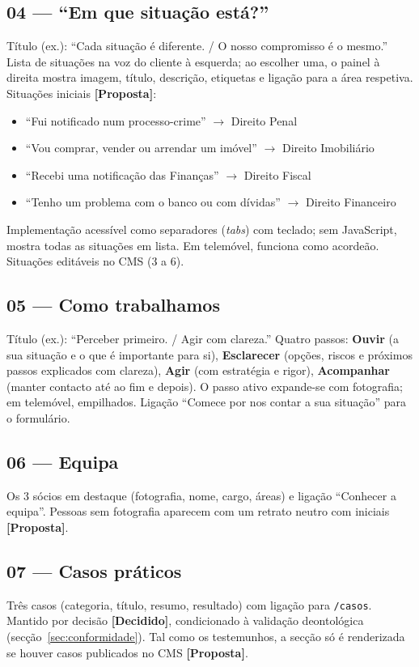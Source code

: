 \documentclass[11pt,a4paper]{article}
\newcommand{\decidido}{\textcolor{verde700}{\textbf{[Decidido]}}}
\newcommand{\proposta}{\textcolor{bronze}{\textbf{[Proposta]}}}
\begin{document}
\subsection*{04 --- ``Em que situação está?''}\label{sec:situacoes}
Título (ex.): ``Cada situação é diferente. / O nosso compromisso é o mesmo.'' Lista de situações na voz do cliente à esquerda; ao escolher uma, o painel à direita mostra imagem, título, descrição, etiquetas e ligação para a área respetiva. Situações iniciais \proposta:
\begin{itemize}
  \item ``Fui notificado num processo-crime'' $\rightarrow$ Direito Penal
  \item ``Vou comprar, vender ou arrendar um imóvel'' $\rightarrow$ Direito Imobiliário
  \item ``Recebi uma notificação das Finanças'' $\rightarrow$ Direito Fiscal
  \item ``Tenho um problema com o banco ou com dívidas'' $\rightarrow$ Direito Financeiro
\end{itemize}
Implementação acessível como separadores (\textit{tabs}) com teclado; sem JavaScript, mostra todas as situações em lista. Em telemóvel, funciona como acordeão. Situações editáveis no CMS (3 a 6).

\subsection*{05 --- Como trabalhamos}
Título (ex.): ``Perceber primeiro. / Agir com clareza.'' Quatro passos: \textbf{Ouvir} (a sua situação e o que é importante para si), \textbf{Esclarecer} (opções, riscos e próximos passos explicados com clareza), \textbf{Agir} (com estratégia e rigor), \textbf{Acompanhar} (manter contacto até ao fim e depois). O passo ativo expande-se com fotografia; em telemóvel, empilhados. Ligação ``Comece por nos contar a sua situação'' para o formulário.

\subsection*{06 --- Equipa}
Os 3 sócios em destaque (fotografia, nome, cargo, áreas) e ligação ``Conhecer a equipa''. Pessoas sem fotografia aparecem com um retrato neutro com iniciais \proposta.

\subsection*{07 --- Casos práticos}
Três casos (categoria, título, resumo, resultado) com ligação para \texttt{/casos}. Mantido por decisão \decidido, condicionado à validação deontológica (secção~\ref{sec:conformidade}). Tal como os testemunhos, a secção só é renderizada se houver casos publicados no CMS \proposta.
\end{document}
